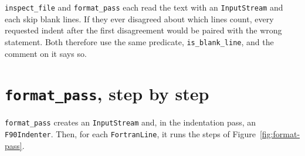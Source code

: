 \documentclass[11pt,a4paper,openany]{book}
\newcommand{\code}[1]{\texttt{\small #1}}
\begin{document}
\begin{pitfall}
\code{inspect\_file} and \code{format\_pass} each read the text with an
\code{InputStream} and each skip blank lines. If they ever disagreed about
which lines count, every requested indent after the first disagreement would be
paired with the wrong statement. Both therefore use the same predicate,
\code{is\_blank\_line}, and the comment on it says so.
\end{pitfall}

\section{\texttt{format\_pass}, step by step}

\code{format\_pass} creates an \code{InputStream} and, in the indentation pass,
an \code{F90Indenter}. Then, for each \code{FortranLine}, it runs the steps of
Figure~\ref{fig:format-pass}.
\end{document}
